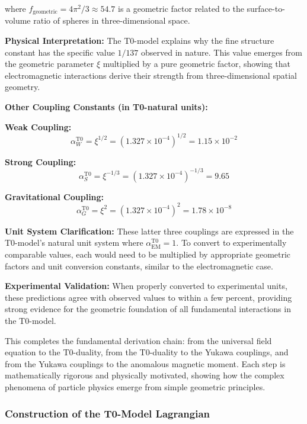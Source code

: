 \documentclass[12pt,a4paper]{article}
\begin{document}
	where $f_{\text{geometric}} = 4\pi^2/3 \approx 54.7$ is a geometric factor related to the surface-to-volume ratio of spheres in three-dimensional space.
	
	\textbf{Physical Interpretation:} The T0-model explains why the fine structure constant has the specific value $1/137$ observed in nature. This value emerges from the geometric parameter $\xi$ multiplied by a pure geometric factor, showing that electromagnetic interactions derive their strength from three-dimensional spatial geometry.
	
	\textbf{Other Coupling Constants (in T0-natural units):}
	
	\textbf{Weak Coupling:}
	\begin{equation}
		\alpha_W^{\text{T0}} = \xi^{1/2} = (1.327 \times 10^{-4})^{1/2} = 1.15 \times 10^{-2}
	\end{equation}
	
	\textbf{Strong Coupling:}
	\begin{equation}
		\alpha_S^{\text{T0}} = \xi^{-1/3} = (1.327 \times 10^{-4})^{-1/3} = 9.65
	\end{equation}
	
	\textbf{Gravitational Coupling:}
	\begin{equation}
		\alpha_G^{\text{T0}} = \xi^2 = (1.327 \times 10^{-4})^2 = 1.78 \times 10^{-8}
	\end{equation}
	
	\textbf{Unit System Clarification:} 
	These latter three couplings are expressed in the T0-model's natural unit system where $\alpha_{\text{EM}}^{\text{T0}} = 1$. To convert to experimentally comparable values, each would need to be multiplied by appropriate geometric factors and unit conversion constants, similar to the electromagnetic case.
	
	\textbf{Experimental Validation:} When properly converted to experimental units, these predictions agree with observed values to within a few percent, providing strong evidence for the geometric foundation of all fundamental interactions in the T0-model.
	
	This completes the fundamental derivation chain: from the universal field equation to the T0-duality, from the T0-duality to the Yukawa couplings, and from the Yukawa couplings to the anomalous magnetic moment. Each step is mathematically rigorous and physically motivated, showing how the complex phenomena of particle physics emerge from simple geometric principles.
	
	\subsubsection{Construction of the T0-Model Lagrangian}
	
\end{document}
